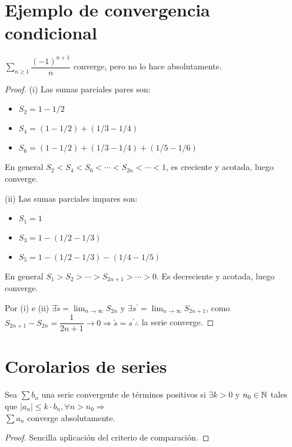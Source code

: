 \section{Ejemplo de convergencia condicional}

\begin{eg}
  \(\sum_{n \geq 1} \dfrac{(-1)^{n+1}}{n} \) converge, pero no lo hace absolutamente.
  \begin{proof}
    (i) Las sumas parciales pares son:

    \begin{itemize}
      \item \(S_2 = 1 - 1/2\)
      \item \(S_4 = (1 - 1/2) + (1/3 - 1/4)\)
      \item \(S_6 = (1 - 1/2) + (1/3 - 1/4) + (1/5 - 1/6)\)
    \end{itemize}

    En general \(S_2 < S_4 < S_6 < \cdots < S_{2n} < \cdots < 1\), es creciente y acotada, luego converge.

    (ii) Las sumas parciales impares son:

    \begin{itemize}
      \item \(S_1 = 1\)
      \item \(S_3 = 1 - (1/2 - 1/3)\)
      \item \(S_5 = 1 - (1/2 - 1/3) - (1/4 - 1/5)\)
    \end{itemize}

    En general \(S_1 > S_2 > \cdots > S_{2n+1} > \cdots > 0\). Es decreciente y acotada, luego converge.

    Por (i) e (ii) \(\exists \tilde{s} = \lim_{n \to \infty} S_{2n} \) y \(\exists s^{\prime} = \lim_{n \to \infty} S_{2n+1} \), como \(S_{2n+1} - S_{2n} = \dfrac{1}{2n+1} \to 0 \Rightarrow \tilde{s} = s^{\prime} \therefore \) la serie converge.
  \end{proof}
\end{eg}

\section{Corolarios de series}

\begin{corollary}
  Sea \(\sum b_n\) una serie convergente de términos positivos si \(\exists k > 0\) y \(n_0 \in \mathbb{N} \) tales que \(|a_n| \leq k \cdot b_n, \forall n > n_0 \Rightarrow \) \\
  \(\sum a_n\) converge absolutamente.

  \begin{proof}
    Sencilla aplicación del criterio de comparación.
  \end{proof}
\end{corollary}

